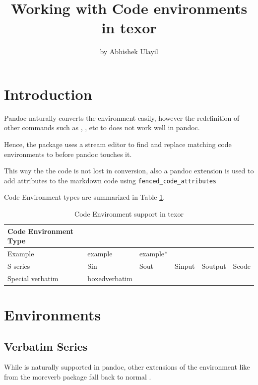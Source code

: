 \title{Working with Code environments in texor}
\author{by Abhishek Ulayil}

\maketitle


\section{Introduction}

Pandoc naturally converts the  environment easily, however the redefinition of other commands such as , ,  etc to  does not work well in pandoc.

Hence, the  package uses a stream editor to find and replace matching code environments to  before pandoc touches it.

This way the the code is not lost in conversion, also a pandoc extension is used to add attributes to the markdown code using  \verb|fenced_code_attributes|

Code Environment types are summarized in Table \ref{table:1}.

\begin{table}[htbp]
\centering
\begin{tabular}{l | lllll }
 \hline
 Code Environment Type &  &  &  & & \\
 \hline
 Example          & example & example* &  & & \\
 S series         & Sin & Sout & Sinput & Soutput & Scode \\
 Special verbatim & boxedverbatim & &  & & \\
\hline
\end{tabular}
\caption{Code Environment support in texor}
\label{table:1}
\end{table}


\section{Environments}

\subsection{Verbatim Series}
While  is naturally supported in pandoc, other extensions of the  environment
like  from the moreverb package \citep{moreverb} fall back to normal .

